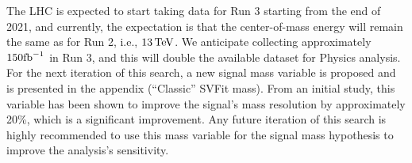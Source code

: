 The LHC is expected to start taking data for Run 3 starting from the end of 2021, and currently, the expectation is that the center-of-mass energy will remain the same as for Run 2, i.e., $13 \,\text{Te\hspace{-.08em}V}$. We anticipate collecting approximately $150 \text{fb}^{-1}$ in Run 3, and this will double the available dataset for Physics analysis. For the next iteration of this search, a new signal mass variable is proposed and is presented in the appendix (``Classic'' SVFit mass). From an initial study, this variable has been shown to improve the signal's mass resolution by approximately 20\%, which is a significant improvement. Any future iteration of this search is highly recommended to use this mass variable for the signal mass hypothesis to improve the analysis's sensitivity.
